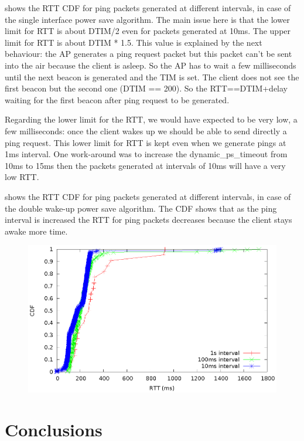  shows the RTT CDF for ping packets generated at different intervals, in case of the single interface power save algorithm. The main issue here is that the lower limit for RTT is about DTIM/2 even for packets generated at 10ms. The upper limit for RTT is about DTIM * 1.5. This value is explained by the next behaviour: the AP generates a ping request packet but this packet can't be sent into the air because the client is asleep. So the AP has to wait a few milliseconds until the next beacon is generated and the TIM is set. The client does not see the first beacon but the second one (DTIM == 200). So the RTT==DTIM+delay waiting for the first beacon after ping request to be generated.

Regarding the lower limit for the RTT, we would have expected to be very low, a few milliseconds: once the client wakes up we should be able to send directly a ping request. This lower limit for RTT is kept even when we generate pings at 1ms interval. One work-around was to increase the dynamic_ps_timeout from 10ms to 15ms then the packets generated at intervals of 10ms will have a very low RTT.

 shows the RTT CDF for ping packets generated at different intervals, in case of the double wake-up power save algorithm. The CDF shows that as the ping interval is increased the RTT for ping packets decreases because the client stays awake more time.

\begin{figure}
\includegraphics{src/img/cdfdouble.eps}
\label{img:cdfdouble}
\end{figure}

\chapter{Conclusions}

